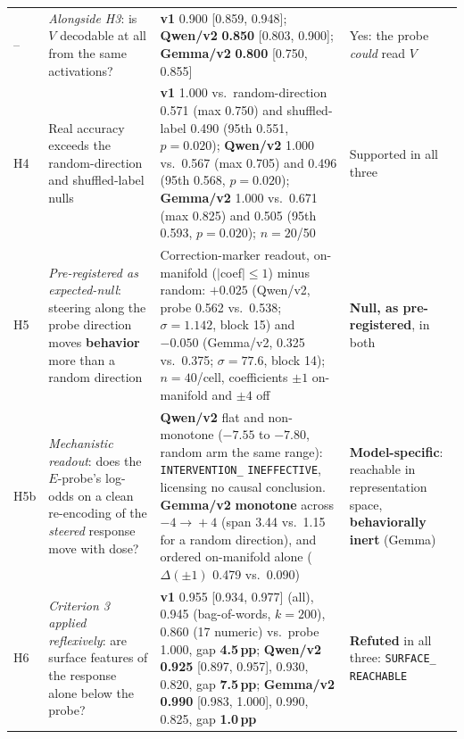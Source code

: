 \begin{table}[h]
\begin{scriptsize}
\begin{tabular}{@{}p{0.24in}p{1.30in}p{2.55in}p{0.87in}@{}}
\addlinespace[1pt]
-- & \emph{Alongside H3}: is $V$ decodable at all from the same activations? & \textbf{v1} 0.900 [0.859, 0.948]; \textbf{Qwen/v2} \textbf{0.850} [0.803, 0.900]; \textbf{Gemma/v2} \textbf{0.800} [0.750, 0.855] & Yes: the probe \emph{could} read $V$ \\
\addlinespace[1pt]
H4 & Real accuracy exceeds the random-direction and shuffled-label nulls & \textbf{v1} 1.000 vs.\ random-direction 0.571 (max 0.750) and shuffled-label 0.490 (95th 0.551, $p\!=\!0.020$); \textbf{Qwen/v2} 1.000 vs.\ 0.567 (max 0.705) and 0.496 (95th 0.568, $p\!=\!0.020$); \textbf{Gemma/v2} 1.000 vs.\ 0.671 (max 0.825) and 0.505 (95th 0.593, $p\!=\!0.020$); $n\!=\!20$/50 & Supported in all three \\
\addlinespace[1pt]
H5 & \emph{Pre-registered as expected-null}: steering along the probe direction moves \textbf{behavior} more than a random direction & Correction-marker readout, on-manifold ($|$coef$|\!\leq\!1$) minus random: \textbf{$+0.025$} (Qwen/v2, probe 0.562 vs.\ 0.538; $\sigma\!=\!1.142$, block 15) and \textbf{$-0.050$} (Gemma/v2, 0.325 vs.\ 0.375; $\sigma\!=\!77.6$, block 14); $n\!=\!40$/cell, coefficients $\pm1$ on-manifold and $\pm4$ off & \textbf{Null, as pre-registered}, in both \\
\addlinespace[1pt]
H5b & \emph{Mechanistic readout}: does the $E$-probe's log-odds on a clean re-encoding of the \emph{steered} response move with dose? & \textbf{Qwen/v2} flat and non-monotone ($-7.55$ to $-7.80$, random arm the same range): \texttt{INTERVENTION\_} \texttt{INEFFECTIVE}, licensing no causal conclusion. \textbf{Gemma/v2} \textbf{monotone} across $-4\!\to\!+4$ (span 3.44 vs.\ 1.15 for a random direction), and ordered on-manifold alone ($\Delta(\pm1)$ 0.479 vs.\ 0.090) & \textbf{Model-specific}: reachable in representation space, \textbf{behaviorally inert} (Gemma) \\
\addlinespace[1pt]
H6 & \emph{Criterion 3 applied reflexively}: are surface features of the response alone below the probe? & \textbf{v1} 0.955 [0.934, 0.977] (all), 0.945 (bag-of-words, $k\!=\!200$), 0.860 (17 numeric) vs.\ probe 1.000, gap \textbf{4.5\,pp}; \textbf{Qwen/v2} \textbf{0.925} [0.897, 0.957], 0.930, 0.820, gap \textbf{7.5\,pp}; \textbf{Gemma/v2} \textbf{0.990} [0.983, 1.000], 0.990, 0.825, gap \textbf{1.0\,pp} & \textbf{Refuted} in all three: \texttt{SURFACE\_} \texttt{REACHABLE} \\
\bottomrule
\end{tabular}
\end{scriptsize}
\end{table}

